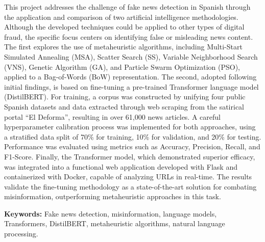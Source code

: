This project addresses the challenge of fake news detection in Spanish through the application and comparison of two artificial intelligence methodologies. Although the developed techniques could be applied to other types of digital fraud, the specific focus centers on identifying false or misleading news content. The first explores the use of metaheuristic algorithms, including Multi-Start Simulated Annealing (MSA), Scatter Search (SS), Variable Neighborhood Search (VNS), Genetic Algorithm (GA), and Particle Swarm Optimization (PSO), applied to a Bag-of-Words (BoW) representation. The second, adopted following initial findings, is based on fine-tuning a pre-trained Transformer language model (DistilBERT). For training, a corpus was constructed by unifying four public Spanish datasets and data extracted through web scraping from the satirical portal ``El Deforma'', resulting in over 61,000 news articles. A careful hyperparameter calibration process was implemented for both approaches, using a stratified data split of 70\% for training, 10\% for validation, and 20\% for testing. Performance was evaluated using metrics such as Accuracy, Precision, Recall, and F1-Score. Finally, the Transformer model, which demonstrated superior efficacy, was integrated into a functional web application developed with Flask and containerized with Docker, capable of analyzing URLs in real-time. The results validate the fine-tuning methodology as a state-of-the-art solution for combating misinformation, outperforming metaheuristic approaches in this task.

\vspace{0.9cm}
\textbf{Keywords:} Fake news detection, misinformation, language models, Transformers, DistilBERT, metaheuristic algorithms, natural language processing.

\shipout\null
